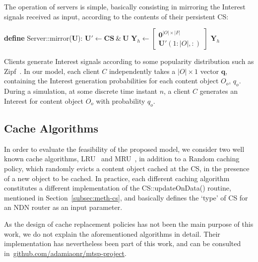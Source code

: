 The operation of servers is simple, basically consisting in mirroring the 
Interest signals received as input, according to the contents of their 
persistent CS:\shortvertbreak

\begin{algorithmic}[1]

\State \textbf{define} Server::mirror(\textbf{U}):
\Statex[2]
    \State $\textbf{U}' \leftarrow \textbf{CS} \ \& \ \textbf{U}$ 
    \Statex[2]
    \State $\textbf{Y}_h \leftarrow \begin{bmatrix} \textbf{0}^{|O| \times |F|} \\ \textbf{U}'(1:|O|,:) \end{bmatrix}$ 
    \Statex[2]
    \State \Return $\textbf{Y}_h$

\end{algorithmic}\shortvertbreak

Clients generate Interest signals according 
to some popularity distribution such as Zipf~\cite{6038471}. In our model, each 
client $C$ independently takes a $|O| \times 1$ vector $\textbf{q}$, containing 
the Interest generation probabilities for each content object $O_o$, $q_o$. During 
a simulation, at 
some discrete time instant $n$, a client $C$ generates an Interest for content 
object $O_o$ with probability $q_o$.

\subsection{Cache Algorithms}
\label{subsec:meth-caching-algs}

In order to evaluate the feasibility of the proposed model, we consider two 
well known cache algorithms, LRU~\cite{Johnson:1994:LOH:645920.672996} and 
MRU~\cite{Chou:1985:EBM:1286760.1286772}, in addition to a Random caching policy, 
which randomly evicts a content object cached at the CS, in the presence 
of a new object to be cached. In practice, each different caching 
algorithm constitutes a different implementation of the CS::updateOnData() 
routine, mentioned in Section~\ref{subsec:meth-cs}, and basically defines 
the `type' of CS for an NDN router as an input parameter.\shortvertbreak

As the design of cache replacement policies has not been the 
main purpose of this work, we do not explain the aforementioned algorithms in 
detail. Their implementation has nevertheless been part of this work, and can 
be consulted in~\url{github.com/adamiaonr/mtsp-project}.

